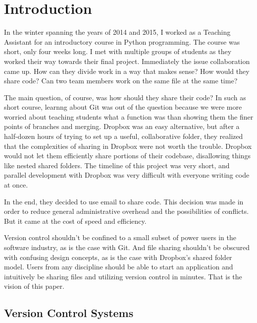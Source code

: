 \chapter{Introduction}

In the winter spanning the years of 2014 and 2015, I worked as a Teaching Assistant for an introductory course in Python programming. The course was short, only four weeks long. I met with multiple groups of students as they worked their way towards their final project. Immediately the issue collaboration came up. How can they divide work in a way that makes sense? How would they share code? Can two team members work on the same file at the same time?

The main question, of course, was how should they share their code? In such as short course, learnng about Git was out of the question because we were more worried about teaching students what a function was than showing them the finer points of branches and merging. Dropbox was an easy alternative, but after a half-dozen hours of trying to set up a useful, collaborative folder, they realized that the complexities of sharing in Dropbox were not worth the trouble. Dropbox would not let them efficiently share portions of their codebase, disallowing things like nested shared folders. The timeline of this project was very short, and parallel development with Dropbox was very difficult with everyone writing code at once. 

In the end, they decided to use email to share code. This decision was made in order to reduce general administrative overhead and the possibilities of conflicts. But it came at the cost of speed and efficiency.

Version control shouldn't be confined to a small subset of power users in the software industry, as is the case with Git. And file sharing shouldn't be obscured with confusing design concepts, as is the case with Dropbox's shared folder model. Users from any discipline should be able to start an application and intuitively be sharing files and utilizing version control in minutes. That is the vision of this paper.

\section{Version Control Systems}

